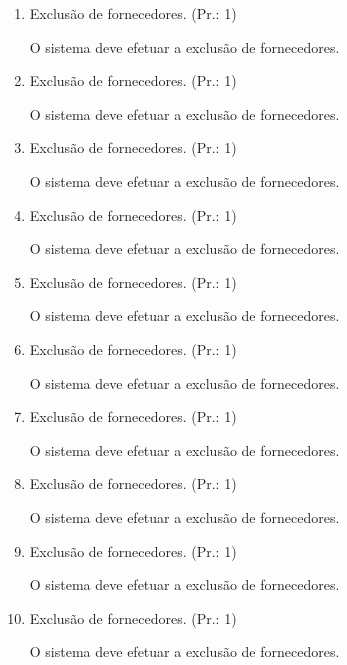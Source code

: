 \begin{enumerate}[
	label=RF\arabic{*}, 
	ref=(RF\arabic{*}),
	leftmargin=1.5em,
	itemindent=4.5em]
\item Exclusão de fornecedores. (Pr.: 1)\par
O sistema deve efetuar a exclusão de fornecedores.\par

\item Exclusão de fornecedores. (Pr.: 1)\par
O sistema deve efetuar a exclusão de fornecedores.\par

\item Exclusão de fornecedores. (Pr.: 1)\par
O sistema deve efetuar a exclusão de fornecedores.\par

\item Exclusão de fornecedores. (Pr.: 1)\par
O sistema deve efetuar a exclusão de fornecedores.\par

\item Exclusão de fornecedores. (Pr.: 1)\par
O sistema deve efetuar a exclusão de fornecedores.\par

\item Exclusão de fornecedores. (Pr.: 1)\par
O sistema deve efetuar a exclusão de fornecedores.\par

\item Exclusão de fornecedores. (Pr.: 1)\par
O sistema deve efetuar a exclusão de fornecedores.\par

\item Exclusão de fornecedores. (Pr.: 1)\par
O sistema deve efetuar a exclusão de fornecedores.\par

\item Exclusão de fornecedores. (Pr.: 1)\par
O sistema deve efetuar a exclusão de fornecedores.\par

\item Exclusão de fornecedores. (Pr.: 1)\par
O sistema deve efetuar a exclusão de fornecedores.\par


\end{enumerate}
